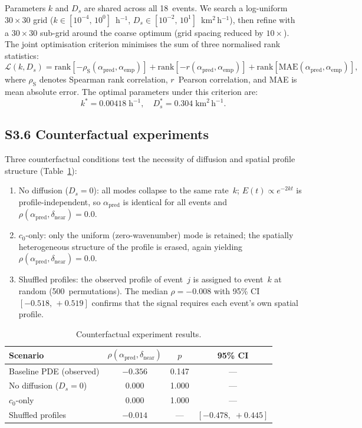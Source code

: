 \documentclass[11pt]{article}
\newcommand{\dnear}{\delta_{\mathrm{near}}}
\newcommand{\apred}{\alpha_{\mathrm{pred}}}
\newcommand{\aemp}{\alpha_{\mathrm{emp}}}
\newcommand{\Ds}{D_s}
\begin{document}
Parameters $k$ and $\Ds$ are shared across all 18~events.  We search
a log-uniform $30 \times 30$ grid ($k \in [10^{-4},\,10^{0}]$~h$^{-1}$,
$\Ds \in [10^{-2},\,10^{1}]$~km$^2$\,h$^{-1}$), then refine with a
$30 \times 30$ sub-grid around the coarse optimum (grid spacing reduced
by $10\times$).  The joint optimisation criterion minimises the sum of
three normalised rank statistics:
\begin{equation}
  \mathcal{L}(k, \Ds)
    = \mathrm{rank}\!\left[-\rho_{\mathrm{S}}(\apred,\aemp)\right]
    + \mathrm{rank}\!\left[-r(\apred,\aemp)\right]
    + \mathrm{rank}\!\left[\mathrm{MAE}(\apred,\aemp)\right] ,
  \label{si:eq:criterion}
\end{equation}
where $\rho_{\mathrm{S}}$ denotes Spearman rank correlation,
$r$~Pearson correlation, and MAE is mean absolute error.  The optimal parameters under this criterion are:
\[
  k^* = 0.00418\;\mathrm{h}^{-1}, \quad
  \Ds^* = 0.304\;\mathrm{km}^2\,\mathrm{h}^{-1} .
\]

\subsection*{S3.6 Counterfactual experiments}

Three counterfactual conditions test the necessity of diffusion and
spatial profile structure (Table~\ref{tab:counterfactual}):

\begin{enumerate}
  \item No diffusion ($\Ds = 0$): all modes collapse to the
        same rate~$k$; $E(t) \propto e^{-2kt}$ is profile-independent,
        so $\apred$ is identical for all events and
        $\rho(\apred,\dnear) = 0.0$.
  \item $c_0$-only: only the uniform (zero-wavenumber) mode
        is retained; the spatially heterogeneous structure of the
        profile is erased, again yielding $\rho(\apred,\dnear) = 0.0$.
  \item Shuffled profiles: the observed profile of event~$j$
        is assigned to event~$k$ at random (500~permutations).
        The median $\rho = -0.008$ with 95\% CI $[-0.518,\,+0.519]$
        confirms that the signal requires each event's own
        spatial profile.
\end{enumerate}

\begin{table}[h]
\centering
\caption{Counterfactual experiment results.}
\label{tab:counterfactual}
\small
\begin{tabular}{@{}lccc@{}}
\toprule
Scenario & $\rho(\apred,\dnear)$ & $p$ & 95\% CI \\
\midrule
Baseline PDE (observed) & $-0.356$ & 0.147 & --- \\
No diffusion ($\Ds = 0$) & $0.000$ & 1.000 & --- \\
$c_0$-only & $0.000$ & 1.000 & --- \\
Shuffled profiles & $-0.014$ & --- & $[-0.478,\;+0.445]$ \\
\bottomrule
\end{tabular}
\end{table}
\end{document}
